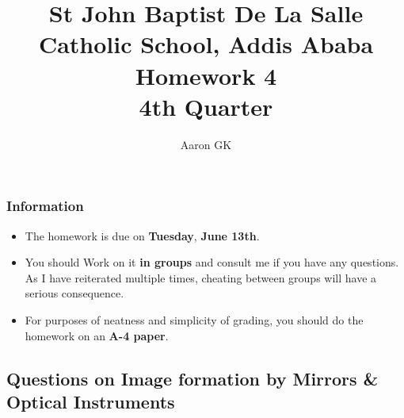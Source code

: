 \documentclass[11pt,addpoints]{exam}
\author{Aaron GK}
\begin{document}
	\title{St John Baptist De La Salle Catholic School, Addis Ababa\\
		\large Homework 4 \\
		4th Quarter}
	\maketitle
	\begin{center}
		\subsubsection*{Information}
		\begin{itemize}
			\item The homework is due on \textbf{Tuesday}, \textbf{June 13th}.
			\item You should Work on it \textbf{in groups} and consult me if you have any questions. As I have reiterated multiple times, cheating between groups will have a serious consequence.
			\item For purposes of neatness and simplicity of grading, you should do the homework on an \textbf{A-4 paper}.
		\end{itemize}
	\end{center}
	\begin{center}
		\subsection*{Questions on Image formation by Mirrors \& Optical Instruments}
	\end{center}
	
\end{document}
